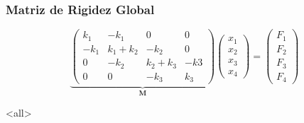 \mode*

\begin{frame}[label=FrameMatrizRigidez]
  \frametitle<presentation>{Matriz de Rigidez Global}

  \begin{equation} \label{eqSistemaLineal}
    \underbrace{
      \begin{pmatrix}
	k_1  & -k_1     & 0    & 0 \\
	-k_1 & k_1 +k_2 & -k_2 & 0 \\
	0    & -k_2     & k_2 + k_3 & -k3\\
	0    &  0       & -k_3      & k_3
      \end{pmatrix}
    }_{\mathbf{M}}
    \begin{pmatrix}
      x_1\\
      x_2\\
      x_3\\
      x_4
    \end{pmatrix}
    =
    \begin{pmatrix}
      F_1\\
      F_2\\
      F_3\\
      F_4
    \end{pmatrix}
  \end{equation}

\end{frame}

\mode<all>
